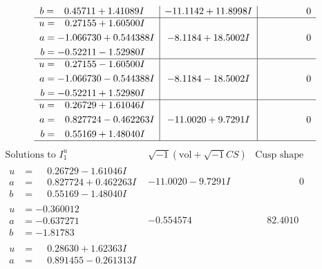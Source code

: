 \documentclass[1p]{elsarticle_modified}
\theoremstyle{definition}
\newcommand{\I}{\sqrt{-1}}
\begin{document}
$$\begin{array}{c|c|c}
\begin{aligned}
b &= \phantom{-}0.45711 + 1.41089 I\end{aligned}
 & -11.1142 + 11.8998 I & \phantom{-0.000000 } 0 \\ \hline\begin{aligned}
u &= \phantom{-}0.27155 + 1.60500 I \\
a &= -1.066730 + 0.544388 I \\
b &= -0.52211 - 1.52980 I\end{aligned}
 & -8.1184 + 18.5002 I & \phantom{-0.000000 } 0 \\ \hline\begin{aligned}
u &= \phantom{-}0.27155 - 1.60500 I \\
a &= -1.066730 - 0.544388 I \\
b &= -0.52211 + 1.52980 I\end{aligned}
 & -8.1184 - 18.5002 I & \phantom{-0.000000 } 0 \\ \hline\begin{aligned}
u &= \phantom{-}0.26729 + 1.61046 I \\
a &= \phantom{-}0.827724 - 0.462263 I \\
b &= \phantom{-}0.55169 + 1.48040 I\end{aligned}
 & -11.0020 + 9.7291 I & \phantom{-0.000000 } 0\\
 \hline 
 \end{array}$$\newpage$$\begin{array}{c|c|c}  
\text{Solutions to }I^u_{1}& \I (\text{vol} + \sqrt{-1}CS) & \text{Cusp shape}\\
 \hline 
\begin{aligned}
u &= \phantom{-}0.26729 - 1.61046 I \\
a &= \phantom{-}0.827724 + 0.462263 I \\
b &= \phantom{-}0.55169 - 1.48040 I\end{aligned}
 & -11.0020 - 9.7291 I & \phantom{-0.000000 } 0 \\ \hline\begin{aligned}
u &= -0.360012\phantom{ +0.000000I} \\
a &= -0.637271\phantom{ +0.000000I} \\
b &= -1.81783\phantom{ +0.000000I}\end{aligned}
 & -0.554574\phantom{ +0.000000I} & \phantom{-}82.4010\phantom{ +0.000000I} \\ \hline\begin{aligned}
u &= \phantom{-}0.28630 + 1.62363 I \\
a &= \phantom{-}0.891455 - 0.261313 I \\

\end{aligned}
\end{array}$$
\end{document}
